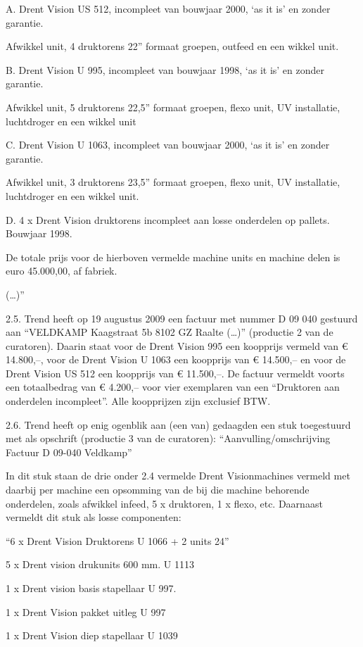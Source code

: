 \documentclass[
  dutch,
  a4paper,
]{article}
\begin{document}
A. Drent Vision US 512, incompleet van bouwjaar 2000, `as it is' en zonder garantie.

Afwikkel unit, 4 druktorens 22'' formaat groepen, outfeed en een wikkel unit.

B. Drent Vision U 995, incompleet van bouwjaar 1998, `as it is' en zonder garantie.

Afwikkel unit, 5 druktorens 22,5'' formaat groepen, flexo unit, UV installatie, luchtdroger en een wikkel unit

C. Drent Vision U 1063, incompleet van bouwjaar 2000, `as it is' en zonder garantie.

Afwikkel unit, 3 druktorens 23,5'' formaat groepen, flexo unit, UV installatie, luchtdroger en een wikkel unit.

D. 4 x Drent Vision druktorens incompleet aan losse onderdelen op pallets. Bouwjaar 1998.

De totale prijs voor de hierboven vermelde machine units en machine delen is euro 45.000,00, af fabriek.

(\ldots)''

2.5. Trend heeft op 19 augustus 2009 een factuur met nummer D 09 040 gestuurd aan ``VELDKAMP Kaagstraat 5b 8102 GZ Raalte (\ldots)'' (productie 2 van de curatoren). Daarin staat voor de Drent Vision 995 een koopprijs vermeld van € 14.800,--, voor de Drent Vision U 1063 een koopprijs van € 14.500,-- en voor de Drent Vision US 512 een koopprijs van € 11.500,--. De factuur vermeldt voorts een totaalbedrag van € 4.200,-- voor vier exemplaren van een ``Druktoren aan onderdelen incompleet''. Alle koopprijzen zijn exclusief BTW.

2.6. Trend heeft op enig ogenblik aan (een van) gedaagden een stuk toegestuurd met als opschrift (productie 3 van de curatoren): ``Aanvulling/omschrijving Factuur D 09-040 Veldkamp''

In dit stuk staan de drie onder 2.4 vermelde Drent Visionmachines vermeld met daarbij per machine een opsomming van de bij die machine behorende onderdelen, zoals afwikkel infeed, 5 x druktoren, 1 x flexo, etc. Daarnaast vermeldt dit stuk als losse componenten:

``6 x Drent Vision Druktorens U 1066 + 2 units 24''

5 x Drent vision drukunits 600 mm. U 1113

1 x Drent vision basis stapellaar U 997.

1 x Drent Vision pakket uitleg U 997

1 x Drent Vision diep stapellaar U 1039
\end{document}
